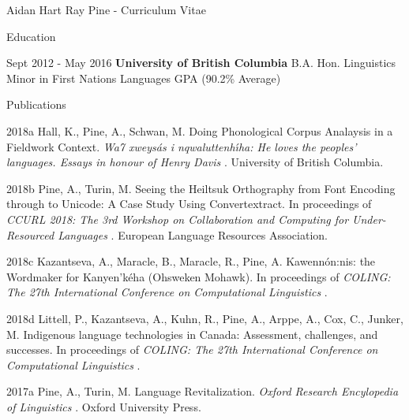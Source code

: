 \documentclass[12pt]{letter}
\date{}
\begin{document}
        \begin{cv}{ Aidan Hart Ray Pine  \space - \space   Curriculum Vitae}
        \vspace{1mm}

                    \begin{cvlist}{Education}
                \item[Sept 2012 - May 2016] \textbf{University of British Columbia}
            \newline B.A. Hon. Linguistics
            \newline Minor in First Nations Languages
             GPA (90.2\% Average)
            \end{cvlist}
        
        
        \begin{cvlist}{Publications}
                                                                        \item[2018a]  Hall,  K.,  Pine,  A.,  Schwan,  M.  Doing Phonological Corpus Analaysis in a Fieldwork Context. \textit{ Wa7 xweys{\'a}s i nqwaluttenh{\'\i}ha: He loves the peoples' languages. Essays in honour of Henry Davis }.  University of British Columbia.  
                                                                                \item[2018b] Pine, A., Turin, M.  Seeing the Heiltsuk Orthography from Font Encoding through to Unicode: A Case Study Using Convertextract. In proceedings of \textit{ CCURL 2018: The 3rd Workshop on Collaboration and Computing for Under-Resourced Languages }.  European Language Resources Association.  
                                                                                \item[2018c] Kazantseva, A., Maracle, B., Maracle, R., Pine, A.  Kawenn{\'o}n:nis: the Wordmaker for Kanyen'k{\'e}ha (Ohsweken Mohawk). In proceedings of \textit{ COLING: The 27th International Conference on Computational Linguistics }.  
                                                                                \item[2018d] Littell, P., Kazantseva, A., Kuhn, R., Pine, A., Arppe, A., Cox, C., Junker, M.  Indigenous language technologies in Canada: Assessment, challenges, and successes. In proceedings of \textit{ COLING: The 27th International Conference on Computational Linguistics }.  
                                                                                                            \item[2017a]  Pine,  A.,  Turin,  M.  Language Revitalization. \textit{ Oxford Research Encylopedia of Linguistics }.  Oxford University Press.  

\end{cvlist}
\end{cv}
\end{document}
